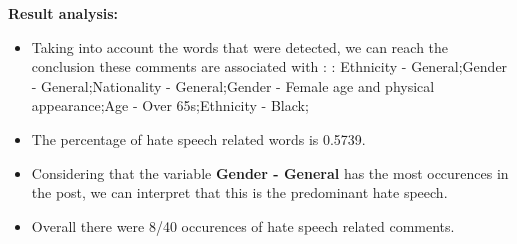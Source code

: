 \documentclass[11pt]{article}
\begin{document}
\textbf{\Large Result analysis:}

\begin{itemize}\item Taking into account the words that were detected, we can reach the conclusion these comments are associated with : : Ethnicity - General;Gender - General;Nationality - General;Gender - Female age and physical appearance;Age - Over 65s;Ethnicity - Black;%

\item The percentage of hate speech related words is 0.5739.

\item Considering that the variable \textbf{Gender - General} has the most occurences in the post, we can interpret that this is the predominant hate speech.

\item Overall there were 8/40 occurences of hate speech related comments.\end{itemize}
\end{document}
